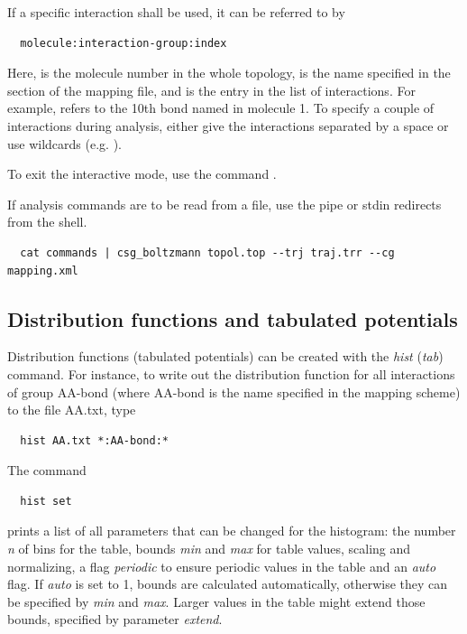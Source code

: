 If a specific interaction shall be used, it can be referred to by
\begin{verbatim}
  molecule:interaction-group:index
\end{verbatim}
Here,  is the molecule number in the whole topology,  is the name specified in the  section of the mapping file, and  is the entry in the list of interactions. For example,  refers to the 10th bond named  in molecule 1. To specify a couple of interactions during analysis, either give the interactions separated by a space or use wildcards (e.g. ).

To exit the interactive mode, use the command . 

If analysis commands are to be read from a file, use the pipe or stdin redirects from the shell.
\begin{verbatim}
  cat commands | csg_boltzmann topol.top --trj traj.trr --cg mapping.xml
\end{verbatim}

\subsection{Distribution functions and tabulated potentials}
Distribution functions (tabulated potentials) can be created with the \textit{hist} (\textit{tab}) command.
For instance, to write out the distribution function for all interactions of group AA-bond (where AA-bond is the name specified in the mapping scheme) to the file AA.txt, type
\begin{verbatim}
  hist AA.txt *:AA-bond:*
\end{verbatim}
The command
\begin{verbatim}
  hist set
\end{verbatim}
prints a list of all parameters that can be changed for the histogram: the number \textit{n} of bins for the table, bounds \textit{min} and \textit{max} for table values, scaling and normalizing, a flag \textit{periodic} to ensure periodic values in the table and an \textit{auto} flag. If \textit{auto} is set to 1, bounds are calculated automatically, otherwise they can be specified by \textit{min} and \textit{max}. Larger values in the table might extend those bounds, specified by parameter \textit{extend}.

